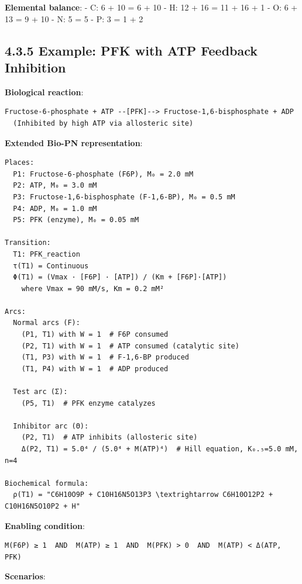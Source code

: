 \textbf{Elemental balance}: - C: 6 + 10 = 6 + 10 \checkmark - H: 12 + 16 = 11 +
16 + 1 \checkmark - O: 6 + 13 = 9 + 10 \checkmark - N: 5 = 5 \checkmark - P: 3 = 1 + 2 \checkmark

\hypertarget{example-pfk-with-atp-feedback-inhibition}{%
\subsection{4.3.5 Example: PFK with ATP Feedback
Inhibition}\label{example-pfk-with-atp-feedback-inhibition}}

\textbf{Biological reaction}:

\begin{lstlisting}
Fructose-6-phosphate + ATP --[PFK]--> Fructose-1,6-bisphosphate + ADP
  (Inhibited by high ATP via allosteric site)
\end{lstlisting}

\textbf{Extended Bio-PN representation}:

\begin{lstlisting}
Places:
  P1: Fructose-6-phosphate (F6P), M₀ = 2.0 mM
  P2: ATP, M₀ = 3.0 mM
  P3: Fructose-1,6-bisphosphate (F-1,6-BP), M₀ = 0.5 mM
  P4: ADP, M₀ = 1.0 mM
  P5: PFK (enzyme), M₀ = 0.05 mM

Transition:
  T1: PFK_reaction
  τ(T1) = Continuous
  Φ(T1) = (Vmax · [F6P] · [ATP]) / (Km + [F6P]·[ATP])
    where Vmax = 90 mM/s, Km = 0.2 mM²

Arcs:
  Normal arcs (F):
    (P1, T1) with W = 1  # F6P consumed
    (P2, T1) with W = 1  # ATP consumed (catalytic site)
    (T1, P3) with W = 1  # F-1,6-BP produced
    (T1, P4) with W = 1  # ADP produced
  
  Test arc (Σ):
    (P5, T1)  # PFK enzyme catalyzes
  
  Inhibitor arc (Θ):
    (P2, T1)  # ATP inhibits (allosteric site)
    Δ(P2, T1) = 5.0⁴ / (5.0⁴ + M(ATP)⁴)  # Hill equation, K₀.₅=5.0 mM, n=4

Biochemical formula:
  ρ(T1) = "C6H10O9P + C10H16N5O13P3 \textrightarrow C6H10O12P2 + C10H16N5O10P2 + H"
\end{lstlisting}

\textbf{Enabling condition}:

\begin{lstlisting}
M(F6P) ≥ 1  AND  M(ATP) ≥ 1  AND  M(PFK) > 0  AND  M(ATP) < Δ(ATP, PFK)
\end{lstlisting}

\textbf{Scenarios}:

